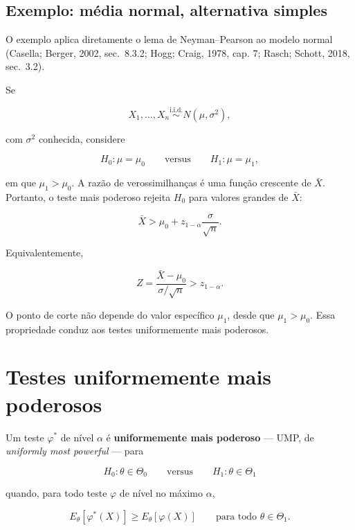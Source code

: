 \documentclass[
  letterpaper,
  DIV=11,
  numbers=noendperiod]{scrreprt}
\begin{document}
\subsection{Exemplo: média normal, alternativa
simples}\label{exemplo-muxe9dia-normal-alternativa-simples}

O exemplo aplica diretamente o lema de Neyman--Pearson ao modelo normal
(Casella; Berger, 2002, sec.~8.3.2; Hogg; Craig, 1978, cap. 7; Rasch;
Schott, 2018, sec.~3.2).

Se

\[X_1,\ldots,X_n\overset{\mathrm{i.i.d.}}{\sim}N(\mu,\sigma^2),\]

com \(\sigma^2\) conhecida, considere

\[H_0:\mu=\mu_0
\qquad\text{versus}\qquad
H_1:\mu=\mu_1,\]

em que \(\mu_1>\mu_0\). A razão de verossimilhanças é uma função
crescente de \(\bar{X}\). Portanto, o teste mais poderoso rejeita
\(H_0\) para valores grandes de \(\bar{X}\):

\[\bar{X}>
\mu_0+z_{1-\alpha}\frac{\sigma}{\sqrt{n}}.\]

Equivalentemente,

\[Z=\frac{\bar{X}-\mu_0}{\sigma/\sqrt{n}}>z_{1-\alpha}.\]

O ponto de corte não depende do valor específico \(\mu_1\), desde que
\(\mu_1>\mu_0\). Essa propriedade conduz aos testes uniformemente mais
poderosos.

\section{Testes uniformemente mais
poderosos}\label{testes-uniformemente-mais-poderosos}

\begin{tcolorbox}[enhanced jigsaw, colback=white, leftrule=.75mm, colbacktitle=quarto-callout-note-color!10!white, breakable, titlerule=0mm, bottomtitle=1mm, title=\textcolor{quarto-callout-note-color}{\faInfo}\hspace{0.5em}{Definição: teste UMP}, colframe=quarto-callout-note-color-frame, toprule=.15mm, opacityback=0, bottomrule=.15mm, opacitybacktitle=0.6, arc=.35mm, toptitle=1mm, rightrule=.15mm, coltitle=black, left=2mm]

Um teste \(\varphi^*\) de nível \(\alpha\) é \textbf{uniformemente mais
poderoso} --- UMP, de \emph{uniformly most powerful} --- para

\[H_0:\theta\in\Theta_0
\qquad\text{versus}\qquad
H_1:\theta\in\Theta_1\]

quando, para todo teste \(\varphi\) de nível no máximo \(\alpha\),

\[E_\theta[\varphi^*(X)]
\geq
E_\theta[\varphi(X)]
\qquad
\text{para todo }\theta\in\Theta_1.\]

\end{tcolorbox}
\end{document}
